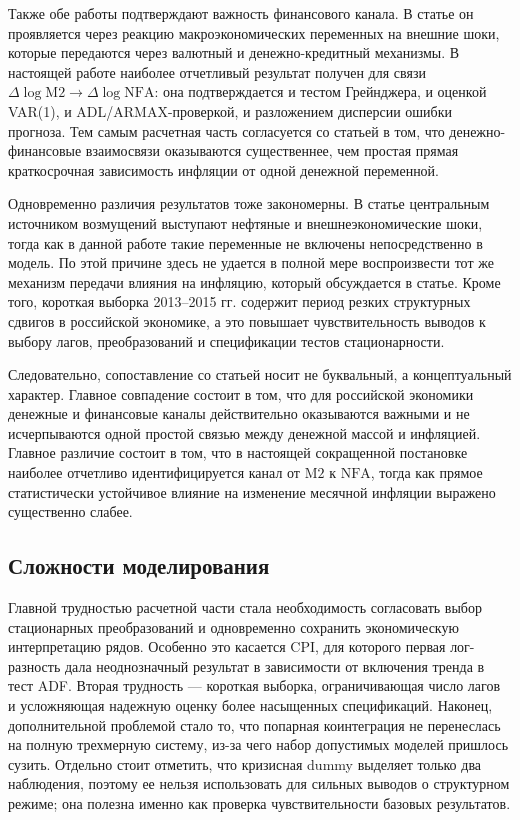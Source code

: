 \documentclass[12pt,a4paper]{article}
\begin{document}
Также обе работы подтверждают важность финансового канала. В статье он проявляется
через реакцию макроэкономических переменных на внешние шоки, которые передаются через
валютный и денежно-кредитный механизмы. В настоящей работе наиболее отчетливый результат
получен для связи $\Delta \log \mathrm{M2} \to \Delta \log \mathrm{NFA}$: она подтверждается и тестом
Грейнджера, и оценкой VAR(1), и ADL/ARMAX-проверкой, и разложением дисперсии ошибки
прогноза. Тем самым расчетная часть согласуется со статьей в том, что денежно-финансовые
взаимосвязи оказываются существеннее, чем простая прямая краткосрочная зависимость
инфляции от одной денежной переменной.

Одновременно различия результатов тоже закономерны. В статье центральным источником
возмущений выступают нефтяные и внешнеэкономические шоки, тогда как в данной работе такие
переменные не включены непосредственно в модель. По этой причине здесь не удается в полной
мере воспроизвести тот же механизм передачи влияния на инфляцию, который обсуждается в
статье. Кроме того, короткая выборка 2013--2015 гг. содержит период резких структурных
сдвигов в российской экономике, а это повышает чувствительность выводов к выбору лагов,
преобразований и спецификации тестов стационарности.

Следовательно, сопоставление со статьей носит не буквальный, а концептуальный характер.
Главное совпадение состоит в том, что для российской экономики денежные и финансовые каналы
действительно оказываются важными и не исчерпываются одной простой связью между денежной
массой и инфляцией. Главное различие состоит в том, что в настоящей сокращенной постановке
наиболее отчетливо идентифицируется канал от $\mathrm{M2}$ к $\mathrm{NFA}$, тогда как прямое статистически
устойчивое влияние на изменение месячной инфляции выражено существенно слабее.

\subsection{Сложности моделирования}
Главной трудностью расчетной части стала необходимость согласовать выбор стационарных
преобразований и одновременно сохранить экономическую интерпретацию рядов. Особенно это
касается $\mathrm{CPI}$, для которого первая лог-разность дала неоднозначный результат в зависимости
от включения тренда в тест ADF. Вторая трудность --- короткая выборка, ограничивающая число
лагов и усложняющая надежную оценку более насыщенных спецификаций. Наконец, дополнительной
проблемой стало то, что попарная коинтеграция не перенеслась на полную трехмерную систему,
из-за чего набор допустимых моделей пришлось сузить. Отдельно стоит отметить, что кризисная
dummy выделяет только два наблюдения, поэтому ее нельзя использовать для сильных выводов о
структурном режиме; она полезна именно как проверка чувствительности базовых результатов.
\end{document}
